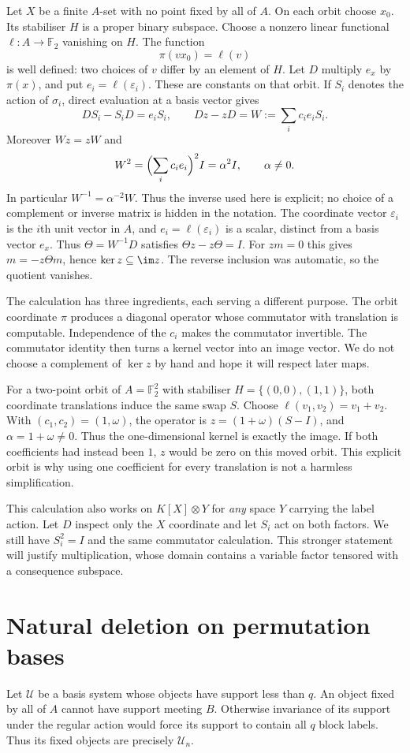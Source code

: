 \documentclass[11pt,a4paper,oneside,openany]{book}
\theoremstyle{definition}\newtheorem{definition}[theorem]{Definition}
\theoremstyle{remark}\newtheorem{remark}[theorem]{Remark}
\newcommand{\Ftwo}{\mathbb F_2}
\numberwithin{equation}{chapter}
\begin{document}
Let $X$ be a finite $A$-set with no point fixed by all of $A$. On each orbit choose $x_0$. Its stabiliser $H$ is a proper binary subspace. Choose a nonzero linear functional $\ell:A\to\Ftwo$ vanishing on $H$. The function
\[\pi(vx_0)=\ell(v)\]
is well defined: two choices of $v$ differ by an element of $H$. Let $D$ multiply $e_x$ by $\pi(x)$, and put $e_i=\ell(\varepsilon_i)$. These are constants on that orbit. If $S_i$ denotes the action of $\sigma_i$, direct evaluation at a basis vector gives
\[DS_i-S_iD=e_iS_i,\qquad Dz-zD=W:=\sum_i c_ie_iS_i.\]
Moreover $Wz=zW$ and
\[W^2=\Bigl(\sum_i c_ie_i\Bigr)^2I=\alpha^2I,\qquad\alpha\ne0.\]
In particular $W^{-1}=\alpha^{-2}W$. Thus the inverse used here
is explicit; no choice of a complement or inverse matrix is hidden
in the notation. The coordinate vector $\varepsilon_i$ is the
$i$th unit vector in $A$, and $e_i=\ell(\varepsilon_i)$ is a
scalar, distinct from a basis vector $e_x$.
Thus $\Theta=W^{-1}D$ satisfies $\Theta z-z\Theta=I$. For $zm=0$ this gives $m=-z\Theta m$, hence $\ker z\subseteq\im z$. The reverse inclusion was automatic, so the quotient vanishes.

The calculation has three ingredients, each serving a different
purpose. The orbit coordinate $\pi$ produces a diagonal operator whose
commutator with translation is computable. Independence of the $c_i$
makes the commutator invertible. The commutator identity then turns a
kernel vector into an image vector. We do not choose a complement of
$\ker z$ by hand and hope it will respect later maps.

For a two-point orbit of $A=\mathbb F_2^2$ with stabiliser
$H=\{(0,0),(1,1)\}$, both coordinate translations induce the same
swap $S$. Choose $\ell(v_1,v_2)=v_1+v_2$. With
$(c_1,c_2)=(1,\omega)$, the operator is
$z=(1+\omega)(S-I)$, and $\alpha=1+\omega\ne0$.
Thus the one-dimensional kernel is exactly the image. If both
coefficients had instead been $1$, $z$ would be zero on this moved
orbit. This explicit orbit is why using one coefficient for every
translation is not a harmless simplification.

This calculation also works on $K[X]\otimes Y$ for \emph{any} space $Y$ carrying the label action. Let $D$ inspect only the $X$ coordinate and let $S_i$ act on both factors. We still have $S_i^2=I$ and the same commutator calculation. This stronger statement will justify multiplication, whose domain contains a variable factor tensored with a consequence subspace.

\section{Natural deletion on permutation bases}
Let $\mathcal U$ be a basis system whose objects have support less than $q$. An object fixed by all of $A$ cannot have support meeting $B$. Otherwise invariance of its support under the regular action would force its support to contain all $q$ block labels. Thus its fixed objects are precisely $\mathcal U_n$.
\end{document}
